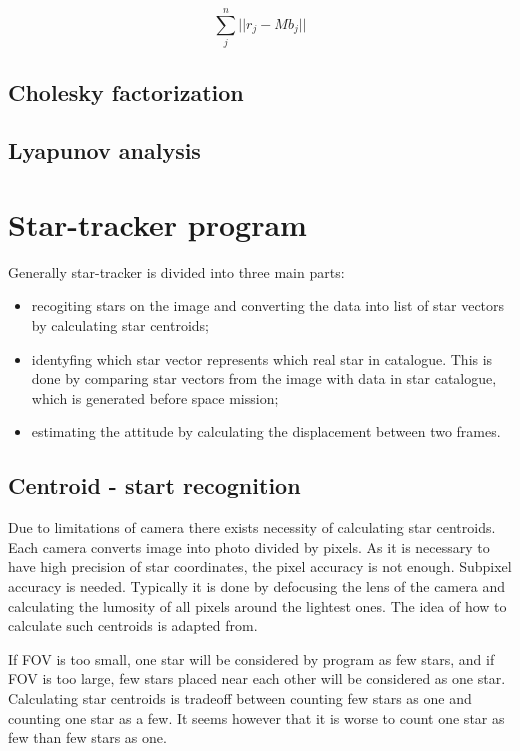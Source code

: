 \documentclass[12pt,a4paper,oneside]{article}
\begin{document}
\begin{equation}
\sum_j^n ||r_j - Mb_j||
\end{equation}
\subsection{Cholesky factorization}
\subsection{Lyapunov analysis}

\newpage
\section{Star-tracker program}
Generally star-tracker is divided into three main parts\cite{6187242}:
\begin{itemize}
\item recogiting stars on the image and converting the data into list of star vectors by calculating star centroids;
\item identyfing which star vector represents which real star in catalogue. This is done by comparing star vectors from the image with data in star catalogue, which is generated before space mission;
\item estimating the attitude by calculating the displacement between two frames.
\end{itemize}
\subsection{Centroid - start recognition}

Due to limitations of camera there exists necessity of calculating star centroids. Each camera converts image into photo divided by pixels. As it is necessary to have high precision of star coordinates, the pixel accuracy is not enough. Subpixel accuracy is needed. Typically it is done by defocusing the lens of the camera and calculating the lumosity of all pixels around the lightest ones. The idea of how to calculate such centroids is adapted from\cite{6187242}.

If FOV is too small, one star will be considered by program as few stars, and if FOV is too large, few stars placed near each other will be considered as one star. Calculating star centroids is tradeoff between counting few stars as one and counting one star as a few. It seems however that it is worse to count one star as few than few stars as one.
\end{document}

